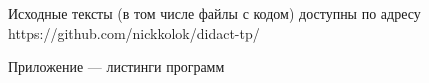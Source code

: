 
\LARGE



Исходные тексты (в том числе файлы с кодом) доступны по адресу https://github.com/nickkolok/didact-tp/





Приложение --- листинги программ






